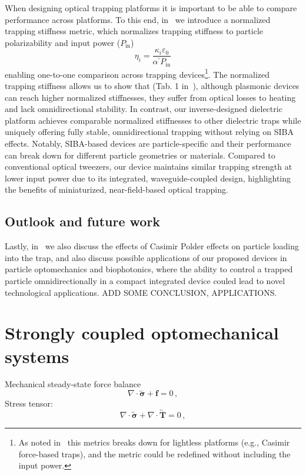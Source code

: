 When designing optical trapping platforms it is important to be able to compare performance across platforms. To this end, in~\cite{ownpub3} we introduce a normalized
trapping stiffness metric, which normalizes trapping stiffness to particle  polarizability and input power ($P_\text{in}$)
\begin{equation}
    \eta_i=\frac{\kappa_i \varepsilon_0}{\alpha^\prime P_{\text{in}}}
\end{equation}
enabling one-to-one comparison across trapping devices\footnote{As noted in~\cite{ownpub3} this metrics breaks down for lightless platforms (e.g., Casimir force-based traps), and the metric could be redefined
without including the input power.}. The normalized trapping stiffness allows us to show that (Tab. 1 in~\cite{ownpub3}), although plasmonic devices can reach higher normalized 
stiffnesses, they suffer from optical losses to heating and lack omnidirectional stability. In contrast, our inverse-designed dielectric platform
 achieves comparable normalized stiffnesses to other dielectric traps while uniquely offering fully stable, omnidirectional trapping
  without relying on SIBA effects. Notably, SIBA-based devices are particle-specific and their performance can break down
   for different particle geometries or materials. Compared to conventional optical tweezers, our device maintains similar trapping
    strength at lower input power due to its integrated, waveguide-coupled design, highlighting the benefits of miniaturized,
     near-field-based optical trapping.

\subsection*{Outlook and future work}

Lastly, in~\cite{ownpub2} we also discuss the effects of Casimir Polder effects on particle loading into the trap, and
also discuss possible applications of our proposed devices in particle optomechanics and
biophotonics, where the ability to control a trapped particle omnidirectionally in a compact integrated device
couled lead to novel technological applications. ADD SOME CONCLUSION, APPLICATIONS.

\section{Strongly coupled optomechanical systems}

Mechanical steady-state force balance
\begin{equation}
    \nabla \cdot \overleftrightarrow{\boldsymbol{\sigma}} + \mathbf{f} = 0\,,
\end{equation}
Stress tensor:
\begin{equation}
    \nabla \cdot \overleftrightarrow{\boldsymbol{\sigma}} + \nabla \cdot \overleftrightarrow{\mathbf{T}} = 0\,,
\end{equation}

